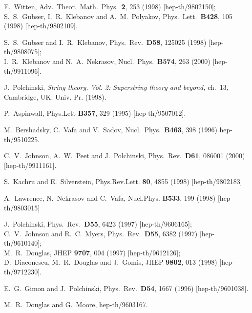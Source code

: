 \documentclass[a4paper,12pt]{article}
\renewcommand{\=}[1]{\bar{#1}}
\begin{document}
\begin{thebibliography}{10}
E.~Witten,
Adv.\ Theor.\ Math.\ Phys.\  {\bf 2}, 253 (1998)
[hep-th/9802150];\\
S.~S.~Gubser, I.~R.~Klebanov and A.~M.~Polyakov,
Phys.\ Lett.\  {\bf B428}, 105 (1998)
[hep-th/9802109].

S.~S.~Gubser and I.~R.~Klebanov,
Phys.\ Rev.\  {\bf D58}, 125025 (1998)
[hep-th/9808075];
\\
I.~R.~Klebanov and N.~A.~Nekrasov,
Nucl.\ Phys.\  {\bf B574}, 263 (2000)
[hep-th/9911096].

J.~Polchinski,
{\it String theory. Vol. 2: Superstring theory and beyond,} ch.\ 13,
Cambridge, UK: Univ. Pr. (1998).

P.~Aspinwall,
Phys.Lett {\bf B357}, 329 (1995)
[hep-th/9507012].

 M.~Bershadsky, C.~Vafa and V.~Sadov,
Nucl.\ Phys.\ {\bf B463}, 398 (1996)
hep-th/9510225.

C.~V.~Johnson, A.~W.~Peet and J.~Polchinski,
Phys.\ Rev.\  {\bf D61}, 086001 (2000)
[hep-th/9911161].

S.~Kachru and E.~Silverstein,
Phys.Rev.Lett. {\bf 80}, 4855 (1998)
[hep-th/9802183]

A.~Lawrence, N.~Nekrasov and C.~Vafa,
Nucl.Phys. {\bf B533}, 199 (1998)
[hep-th/9803015]

J.~Polchinski,
Phys.\ Rev.\  {\bf D55}, 6423 (1997)
[hep-th/9606165];
\\
C.~V.~Johnson and R.~C.~Myers,
Phys.\ Rev.\  {\bf D55}, 6382 (1997)
[hep-th/9610140];
\\
M.~R.~Douglas,
JHEP {\bf 9707}, 004 (1997)
[hep-th/9612126];
\\
D.~Diaconescu, M.~R.~Douglas and J.~Gomis,
JHEP {\bf 9802}, 013 (1998)
[hep-th/9712230].

E.~G.~Gimon and J.~Polchinski,
Phys.\ Rev.\  {\bf D54}, 1667 (1996)
[hep-th/9601038].

M.~R.~Douglas and G.~Moore,
hep-th/9603167.


\end{thebibliography}
\end{document}

